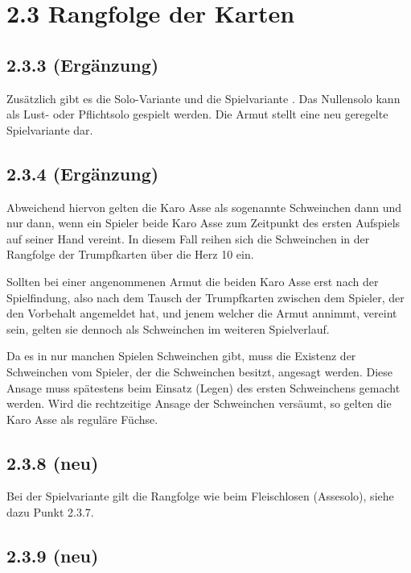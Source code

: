 \section*{2.3 Rangfolge der Karten}

\subsection*{2.3.3 (Ergänzung)}

Zusätzlich gibt es die Solo-Variante  und die
Spielvariante . Das Nullensolo kann als Lust- oder Pflichtsolo
gespielt werden. Die Armut stellt eine neu geregelte Spielvariante dar.

\subsection*{2.3.4 (Ergänzung)}

Abweichend hiervon gelten die Karo Asse als sogenannte Schweinchen dann
und nur dann, wenn ein Spieler beide Karo Asse zum Zeitpunkt des ersten
Aufspiels auf seiner Hand vereint. In diesem Fall reihen sich die
Schweinchen in der Rangfolge der Trumpfkarten über die Herz 10 ein.

Sollten bei einer angenommenen Armut die beiden Karo Asse erst nach der
Spielfindung, also nach dem Tausch der Trumpfkarten zwischen dem
Spieler, der den Vorbehalt angemeldet hat, und jenem welcher die Armut
annimmt, vereint sein, gelten sie dennoch als Schweinchen im weiteren
Spielverlauf.

Da es in nur manchen Spielen Schweinchen gibt, muss die Existenz der
Schweinchen vom Spieler, der die Schweinchen besitzt, angesagt werden.
Diese Ansage muss spätestens beim Einsatz (Legen) des ersten
Schweinchens gemacht werden. Wird die rechtzeitige Ansage der
Schweinchen versäumt, so gelten die Karo Asse als reguläre Füchse.

\subsection*{2.3.8 (neu)}

Bei der Spielvariante  gilt die Rangfolge wie beim
Fleischlosen (Assesolo), siehe dazu Punkt 2.3.7.

\subsection*{2.3.9 (neu)}

